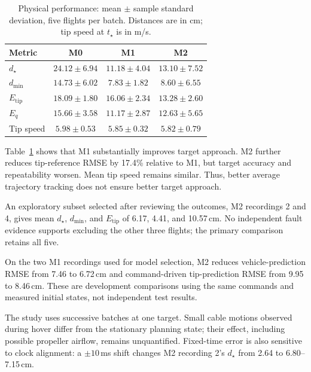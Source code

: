 \documentclass[letterpaper, 10 pt, conference]{ieeeconf}
\begin{document}
\begin{table}[t]
\centering
\caption{Physical performance: mean $\pm$ sample standard
deviation, five flights per batch. Distances are in cm;
tip speed at $t_\star$ is in m/s.}
\label{tab:physical_performance}
\small
\setlength{\tabcolsep}{3pt}
\begin{tabular}{@{}lccc@{}}
\toprule
Metric & M0 & M1 & M2 \\
\midrule
$d_\star$ & $24.12\pm6.94$ & $11.18\pm4.04$ & $13.10\pm7.52$ \\
$d_{\min}$ & $14.73\pm6.02$ & $7.83\pm1.82$ & $8.60\pm6.55$ \\
$E_{\mathrm{tip}}$ & $18.09\pm1.80$ & $16.06\pm2.34$ & $13.28\pm2.60$ \\
$E_q$ & $15.66\pm3.58$ & $11.17\pm2.87$ & $12.63\pm5.65$ \\
Tip speed & $5.98\pm0.53$ & $5.85\pm0.32$ & $5.82\pm0.79$ \\
\bottomrule
\end{tabular}
\end{table}

Table~\ref{tab:physical_performance} shows that M1 substantially
improves target approach. M2 further reduces tip-reference
RMSE by 17.4\% relative to M1, but target accuracy and
repeatability worsen. Mean tip speed remains similar.
Thus, better average trajectory tracking does not ensure
better target approach.

An exploratory subset selected after reviewing the outcomes,
M2 recordings 2 and 4, gives mean $d_\star$, $d_{\min}$,
and $E_{\mathrm{tip}}$ of 6.17, 4.41, and 10.57\,cm.
No independent fault evidence supports excluding the other
three flights; the primary comparison retains all five.

On the two M1 recordings used for model selection, M2 reduces
vehicle-prediction RMSE from 7.46 to 6.72\,cm and command-driven
tip-prediction RMSE from 9.95 to 8.46\,cm. These are development
comparisons using the same commands and measured initial
states, not independent test results.

The study uses successive batches at one target. Small cable
motions observed during hover differ from the stationary
planning state; their effect, including possible propeller
airflow, remains unquantified. Fixed-time error is also
sensitive to clock alignment: a $\pm10$\,ms shift changes
M2 recording 2's $d_\star$ from 2.64 to 6.80--7.15\,cm.




\end{document}
